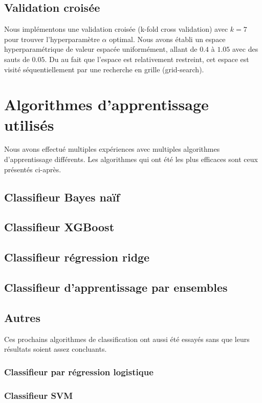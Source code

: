 \documentclass{article}
\begin{document}
\subsection{Validation croisée}
Nous implémentons une validation croisée (k-fold cross validation) avec $k = 7$ pour trouver l'hyperparamètre $\alpha$ optimal. Nous avons établi un espace hyperparamétrique de valeur espacée uniformément, allant de $0.4$ à $1.05$ avec des sauts de $0.05$. Du au fait que l'espace est relativement restreint, cet espace est visité séquentiellement par une recherche en grille (grid-search). 


\section{Algorithmes d'apprentissage utilisés}
Nous avons effectué multiples expériences avec multiples algorithmes d'apprentissage différents. Les algorithmes qui ont été les plus efficaces sont ceux présentés ci-après.
\subsection{Classifieur Bayes naïf}

\subsection{Classifieur XGBoost}

\subsection{Classifieur régression ridge}

\subsection{Classifieur d'apprentissage par ensembles}

\subsection{Autres}
Ces prochains algorithmes de classification ont aussi été essayés sans que leurs résultats soient assez concluants.
\subsubsection{Classifieur par régression logistique}
\subsubsection{Classifieur SVM}
\end{document}
